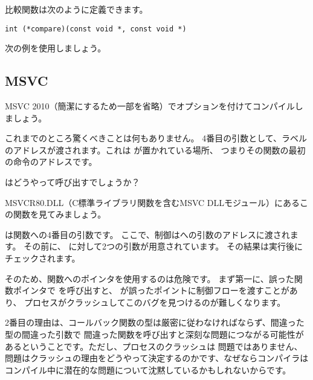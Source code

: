比較関数は次のように定義できます。

\begin{lstlisting}
int (*compare)(const void *, const void *)
\end{lstlisting}

次の例を使用しましょう。



\subsection{MSVC}

MSVC 2010（簡潔にするため一部を省略）で\TT{\Ox}オプションを付けてコンパイルしましょう。



これまでのところ驚くべきことは何もありません。 
4番目の引数として、ラベルのアドレスが渡されます。これは \comp が置かれている場所、
つまりその関数の最初の命令のアドレスです。

\qsort はどうやって呼び出すでしょうか？


MSVCR80.DLL（C標準ライブラリ関数を含むMSVC DLLモジュール）にあるこの関数を見てみましょう。



は関数への4番目の引数です。 
ここで、制御はへの引数のアドレスに渡されます。
その前に、 \comp に対して2つの引数が用意されています。 その結果は実行後にチェックされます。

そのため、関数へのポインタを使用するのは危険です。 
まず第一に、誤った関数ポインタで \qsort を呼び出すと、 \qsort が誤ったポイントに制御フローを渡すことがあり、
プロセスがクラッシュしてこのバグを見つけるのが難しくなります。

2番目の理由は、コールバック関数の型は厳密に従わなければならず、間違った型の間違った引数で
間違った関数を呼び出すと深刻な問題につながる可能性があるということです。ただし、プロセスのクラッシュは
問題ではありません、問題はクラッシュの理由をどうやって決定するのかです、なぜならコンパイラは
コンパイル中に潜在的な問題について沈黙しているかもしれないからです。



